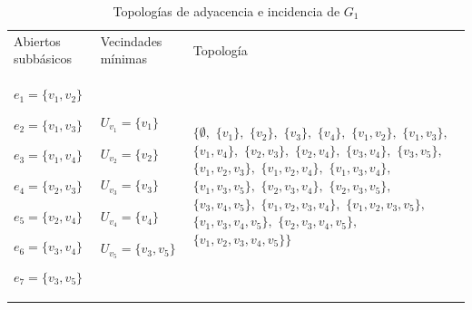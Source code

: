 \begin{table}[p]
\begin{tabular}{@{}>{\centering\arraybackslash}m{}>{\centering\arraybackslash}m{}>{\centering\arraybackslash}m{}@{}}
      \hline
      \multicolumn{3}{c}{\textbf{Topología de incidencia}} \\
      \hline
      Abiertos subbásicos & Vecindades mínimas & Topología \\
      \hline
         ${e_{1}=\{v_1,v_2\}}$\par
         ${e_{2}=\{v_1,v_3\}}$\par
         ${e_{3}=\{v_1,v_4\}}$\par
         ${e_{4}=\{v_2,v_3\}}$\par
         ${e_{5}=\{v_2,v_4\}}$\par
         ${e_{6}=\{v_3,v_4\}}$\par
         ${e_{7}=\{v_3,v_5\}}$
      &
         ${U_{v_1}=\{v_1\}}$\par
         ${U_{v_2}=\{v_2\}}$\par
         ${U_{v_3}=\{v_3\}}$\par
         ${U_{v_4}=\{v_4\}}$\par
         ${U_{v_5}=\{v_3,v_5\}}$
      &
         $\{\emptyset,$ $\{v_1\},$ $\{v_2\},$ $\{v_3\},$ $\{v_4\},$ $\{v_1,v_2\},$ $\{v_1,v_3\},$ $\{v_1,v_4\},$ $\{v_2,v_3\},$ $\{v_2,v_4\},$ $\{v_3,v_4\},$ $\{v_3,v_5\},$ $\{v_1,v_2,v_3\},$ $\{v_1,v_2,v_4\},$ $\{v_1,v_3,v_4\},$ $\{v_1,v_3,v_5\},$ $\{v_2,v_3,v_4\},$ $\{v_2,v_3,v_5\},$ $\{v_3,v_4,v_5\},$ $\{v_1,v_2,v_3,v_4\},$ $\{v_1,v_2,v_3,v_5\},$ $\{v_1,v_3,v_4,v_5\},$ $\{v_2,v_3,v_4,v_5\},$ $\{v_1,v_2,v_3,v_4,v_5\}\}$ \\[6pt]
      \hline
   \end{tabular}
   \caption{Topologías de adyacencia e incidencia de $G_1$}
   \label{tab:topologias_G_1}
\end{table}

